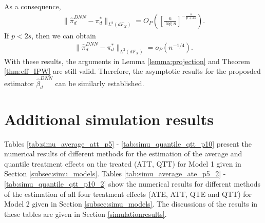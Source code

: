 \documentclass[11pt]{article}
\numberwithin{equation}{section}
\begin{document}
As a consequence,
\begin{align*}
	\|\widehat{\pi}^{DNN}_d-\pi_d^*\|_{L^2(dF_X)}=O_P\left(\left[\frac{n}{\log n}\right]^{-\frac{s}{p+2s}}\right).
\end{align*}
If $p<2s$, then we can obtain
\begin{align*}
	\|\widehat{\pi}^{DNN}_d-\pi_d^*\|_{L^2(dF_X)}=o_P(n^{-1/4}).
\end{align*}
With these results, the arguments in Lemma \ref{lemma:projection} and Theorem \ref{thm:eff_IPW} are still valid. Therefore, the asymptotic results for the proposded estimator $\widehat{\beta}^{DNN}_d$ can be similarly established.


\newpage
\section{Additional simulation results}\label{S6section}

Tables \ref{tab:simu_average_att_p5} - \ref{tab:simu_quantile_qtt_p10} present the numerical results of different methods for the estimation of the average and quantile treatment effects on the treated (ATT, QTT) for Model 1 given in Section \ref{subsec:simu_models}.  Tables \ref{tab:simu_average_ate_p5_2} - \ref{tab:simu_quantile_qtt_p10_2} show the numerical results for different methods of the estimation of all four treatment effects (ATE, ATT, QTE and QTT) for Model 2 given in Section \ref{subsec:simu_models}. The discussions of the results in these tables are given in Section \ref{simulationresults}.
\end{document}
